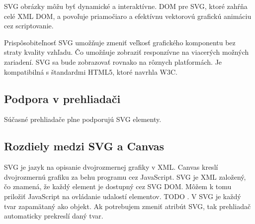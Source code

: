SVG obrázky môžu byť dynamické a interaktívne. \ac*{DOM} pre SVG, ktoré zahŕňa celé XML DOM, a povoľuje priamočiaro a efektívnu vektorovú grafickú animáciu cez scriptovanie. 

Prispôsobiteľnosť SVG umožňuje zmeniť veľkosť grafického komponentu bez straty kvality vzhľadu. Čo umožňuje zobraziť responzívne na viacerých možných zariadení. 
SVG sa bude zobrazovať rovnako na rôznych platformách. Je kompatibilná s štandardmi \acs{HTML}5, ktoré navrhla \ac*{W3C}. 



 
 
 \subsection{Podpora v prehliadači}
 Súčasné prehliadače plne podporujú SVG elementy.
 
 \subsection{Rozdiely medzi SVG a Canvas}

 SVG je jazyk na opisanie dvojrozmernej grafiky v XML. 
 Canvas kreslí dvojrozmernú grafiku za behu programu cez JavaScript.
 SVG je XML založený, čo znamená, že každý element je dostupný cez SVG DOM. Môžem k tomu priložiť JavaScript na ovládanie udalostí elementov. TODO . 
 V SVG je každý tvar zapamätaný ako objekt. Ak potrebujem zmeniť atribút SVG, tak prehliadač  automaticky prekreslí daný tvar.
 
